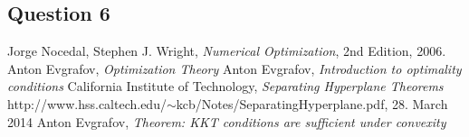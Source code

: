 \documentclass[10pt,a4paper]{article}
\begin{document}
\subsection*{Question 6}




\begin{thebibliography}{}

Jorge Nocedal, Stephen J. Wright, \emph{Numerical Optimization}, 2nd Edition, 2006.
Anton Evgrafov, \emph{Optimization Theory} 
Anton Evgrafov, \emph{Introduction to optimality conditions}
California Institute of Technology, \emph{Separating Hyperplane Theorems} http://www.hss.caltech.edu/$\sim$kcb/Notes/SeparatingHyperplane.pdf, 28. March 2014
Anton Evgrafov, \emph{Theorem: KKT conditions are sufficient under convexity}

\end{thebibliography}
\end{document}
